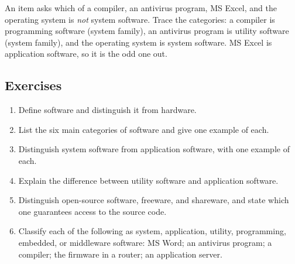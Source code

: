\begin{example}
An item asks which of a compiler, an antivirus program, MS Excel, and the
operating system is \emph{not} system software. Trace the categories: a
compiler is programming software (system family), an antivirus program is
utility software (system family), and the operating system is system software.
MS Excel is application software, so it is the odd one out.
\end{example}

\subsection*{Exercises}
\begin{enumerate}[label=\arabic*.]
  \item Define software and distinguish it from hardware.
  \item List the six main categories of software and give one example of each.
  \item Distinguish system software from application software, with one
    example of each.
  \item Explain the difference between utility software and application
    software.
  \item Distinguish open-source software, freeware, and shareware, and state
    which one guarantees access to the source code.
  \item Classify each of the following as system, application, utility,
    programming, embedded, or middleware software: MS Word; an antivirus
    program; a compiler; the firmware in a router; an application server.
\end{enumerate}

